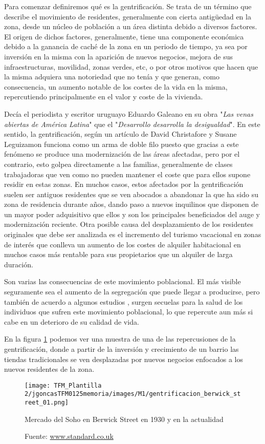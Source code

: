 \documentclass[12pt,a4paper,twoside]{book}
\begin{document}
Para comenzar definiremos qué es la gentrificación. Se trata de un término que describe el movimiento de residentes, generalmente con cierta antigüedad en la zona, desde un núcleo de población a un área distinta debido a diversos factores. El origen de dichos factores, generalmente, tiene una componente económica debido a la ganancia de caché de la zona en un periodo de tiempo, ya sea por inversión en la misma con la aparición de nuevos negocios, mejora de sus infraestructuras, movilidad, zonas verdes, etc, o por otros motivos que hacen que la misma adquiera una notoriedad que no tenía y que generan, como consecuencia, un aumento notable de los costes de la vida en la misma, repercutiendo principalmente en el valor y coste de la vivienda. 

Decía el periodista y escritor uruguayo Eduardo Galeano en su obra "\textit{Las venas abiertas de América Latina}" \cite{eduardo_galeano_venas_2023} que el "\textit{Desarrollo desarrolla la desigualdad}". En este sentido, la gentrificación, según un artículo de David Christafore y Susane Leguizamon \cite{christafore_neighbourhood_2019} funciona como un arma de doble filo puesto que gracias a este fenómeno se produce una modernización de las áreas afectadas, pero por el contrario, esto golpea directamente a las familias, generalmente de clases trabajadoras que ven como no pueden mantener el coste que para ellos supone residir en estas zonas. En muchos casos, estos afectados por la gentrificación suelen ser antiguos residentes que se ven abocados a abandonar la que ha sido su zona de residencia durante años, dando paso a nuevos inquilinos que disponen de un mayor poder adquisitivo que ellos y son los principales beneficiados del auge y modernización reciente. Otra posible causa del desplazamiento de los residentes originales que debe ser analizada es el incremento del turismo vacacional en zonas de interés que conlleva un aumento de los costes de alquiler habitacional en muchos casos más rentable para sus propietarios que un alquiler de larga duración. 

Son varias las consecuencias de este movimiento poblacional. El más visible seguramente sea el aumento de la segregación que puede llegar a producirse, pero también de acuerdo a algunos estudios \cite{cole_breaking_2021}, surgen secuelas para la salud de los individuos que sufren este movimiento poblacional, lo que repercute aun más si cabe en un deterioro de su calidad de vida.

En la figura \ref{fig:figura_soho} podemos ver una muestra de una de las repercusiones de la gentrificación, donde a partir de la inversión y crecimiento de un barrio las tiendas tradicionales se ven desplazadas por nuevos negocios enfocados a los nuevos residentes de la zona.
\begin{figure}[h!]
    \centering
    \texttt{[image: TFM\_Plantilla 2/jgoncasTFM0125memoria/images/M1/gentrificacion\_berwick\_street\_01.png]}
    \caption{Mercado del Soho en Berwick Street en 1930 y en la actualidad}
    \caption*{Fuente: \href{https://www.standard.co.uk/lifestyle/london-life/soho-these-amazing-photographs-show-the-london-neighbourhood-then-and-now-a3368711.html}{www.standard.co.uk}}
    \label{fig:figura_soho}
\end{figure}
\end{document}
